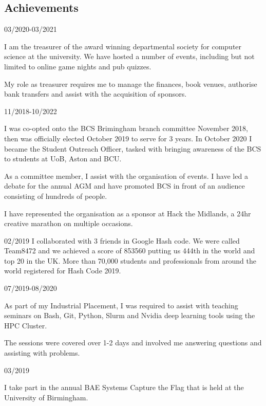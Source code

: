 \documentclass[11pt]{article} %
\begin{document}
\begin{paracol}{2}
\section{Achievements}
{} %
{03/2020-03/2021} %
{} %
{} %
{I am the treasurer of the award winning departmental society for computer science at the university.
We have hosted a number of events, including but not limited to online game nights and pub quizzes.

My role as treasurer requires me to manage the finances, book venues, authorise bank transfers and assist with
the acquisition of sponsors.
}  %

{} %
{11/2018-10/2022} %
{} %
{} %
{I was co-opted onto the BCS Brimingham branch committee November 2018, then was officially
elected October 2019 to serve for 3 years.
In October 2020 I became the Student Outreach Officer, tasked with bringing awareness of the BCS to students at UoB, Aston and BCU.

As a committee member, I assist with the organisation of events. I have led a debate for the annual AGM
and have promoted BCS in front of an audience consisting of hundreds of people.

I have represented the organisation as a sponsor at Hack the Midlands, a 24hr creative marathon on multiple occasions.
}  %

{} %
{02/2019} %
{} %
{} %
{I collaborated with 3 friends in Google Hash code. We were called Team8472 and we achieved a score
of 853560 putting us 444th in the world and top 20 in the UK. More than 70,000 students and professionals
from around the world registered for Hash Code 2019.
}  %

{} %
{07/2019-08/2020} %
{} %
{} %
{As part of my Industrial Placement, I was required to assist with teaching seminars on
Bash, Git, Python, Slurm and Nvidia deep learning tools using the HPC Cluster.

The sessions were covered over 1-2 days and involved me answering questions and assisting with problems.
}  %

{} %
{03/2019} %
{} %
{} %
{I take part in the annual BAE Systems Capture the Flag that is held at the University of Birmingham.

}
\end{paracol}
\end{document}
